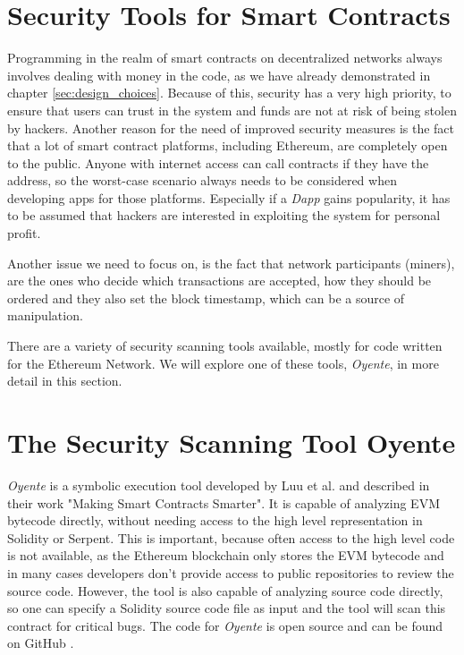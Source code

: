 \section{Security Tools for Smart Contracts}
Programming in the realm of smart contracts on decentralized networks always involves dealing with money in the code, as we have already demonstrated in chapter \ref{sec:design_choices}. Because of this, security has a very high priority, to ensure that users can trust in the system and funds are not at risk of being stolen by hackers. Another reason for the need of improved security measures is the fact that a lot of smart contract platforms, including Ethereum, are completely open to the public. Anyone with internet access can call contracts if they have the address, so the worst-case scenario always needs to be considered when developing apps for those platforms. Especially if a \emph{Dapp} gains popularity, it has to be assumed that hackers are interested in exploiting the system for personal profit.

Another issue we need to focus on, is the fact that network participants (miners), are the ones who decide which transactions are accepted, how they should be ordered and they also set the block timestamp, which can be a source of manipulation.

There are a variety of security scanning tools available, mostly for code written for the Ethereum Network. We will explore one of these tools, \emph{Oyente}, in more detail in this section.

\section*{The Security Scanning Tool Oyente}

\emph{Oyente} is a symbolic execution tool developed by Luu et al. and described in their work "Making Smart Contracts Smarter"\cite{luu2016making}. It is capable of analyzing EVM bytecode directly, without needing access to the high level representation in Solidity or Serpent. This is important, because often access to the high level code is not available, as the Ethereum blockchain only stores the EVM bytecode and in many cases developers don't provide access to public repositories to review the source code. However, the tool is also capable of analyzing source code directly, so one can specify a Solidity source code file as input and the tool will scan this contract for critical bugs. The code for \emph{Oyente} is open source and can be found on GitHub \cite{oyentegithub}.

